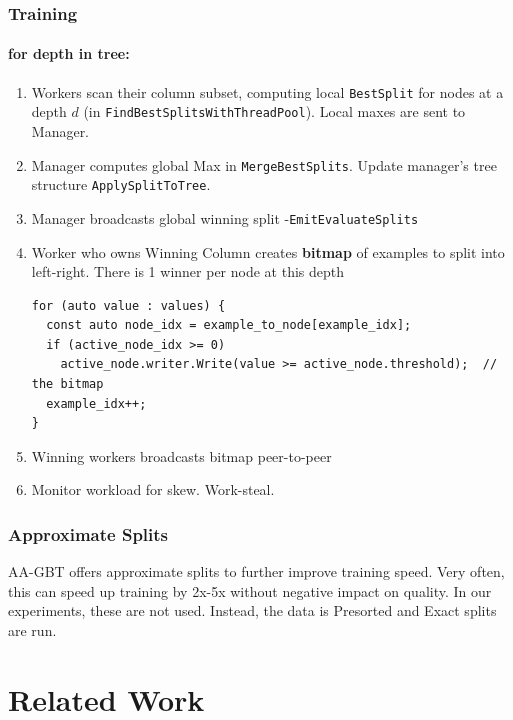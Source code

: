 \documentclass[sigconf,screen]{acmart}
\begin{document}
\subsubsection{Training}

\paragraph{for depth in tree:}

\begin{enumerate}
    \item Workers scan their column subset, computing local \texttt{BestSplit} for nodes at a depth $d$ (in \texttt{FindBestSplitsWithThreadPool}). Local maxes are sent to Manager.
    \item Manager computes global Max in \texttt{MergeBestSplits}. Update manager's tree structure \texttt{ApplySplitToTree}.
    \item Manager broadcasts global winning split -\newline \texttt{EmitEvaluateSplits}
    \item Worker who owns Winning Column creates \textbf{bitmap} of examples to split into left-right. There is 1 winner per node at this depth
        \begin{lstlisting}
for (auto value : values) {
  const auto node_idx = example_to_node[example_idx];
  if (active_node_idx >= 0)
    active_node.writer.Write(value >= active_node.threshold);  // the bitmap
  example_idx++;
}
        \end{lstlisting}
    \item Winning workers broadcasts bitmap peer-to-peer
    \item Monitor workload for skew. Work-steal.
\end{enumerate}


\subsubsection{Approximate Splits}

AA-GBT offers approximate splits to further improve training speed. Very often, this can speed up training by 2x-5x without negative impact on quality. In our experiments, these are not used. Instead, the data is Presorted and Exact splits are run.

\section{Related Work}
\label{sec:related-work}
\end{document}
